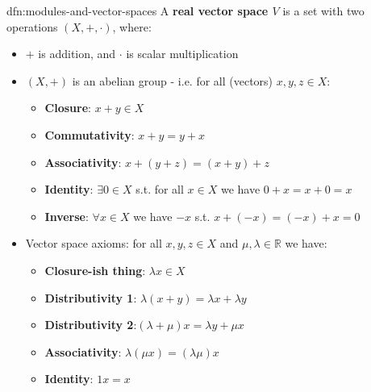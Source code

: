 \documentclass[landscape, 8pt]{extarticle}
\begin{document}
\begin{multicols}{3}
\vspace{-5pt}
\begin{dfn}{dfn:modules-and-vector-spaces}{}
    \vspace{-5pt}
    A \textbf{real vector space $V$} is a set with two operations $(X, +, \cdot)$, where:
    \vspace{-15pt}
    \begin{itemize}[leftmargin=*]
        \item $+$ is addition, and $\cdot$ is scalar multiplication
        \item $(X, +)$ is an abelian group - i.e. for all (vectors) $x,y,z\in X$:
            \vspace{-5pt}
            \begin{itemize}
                \item \textbf{Closure}: $x + y\in X$
                \item \textbf{Commutativity}: $x + y = y + x$
                \item \textbf{Associativity}: $x + (y + z) = (x + y) + z$
                \item \textbf{Identity}: $\exists 0\in X$ s.t. for all $x\in X$ we have $0 + x = x + 0 = x$
                \item \textbf{Inverse}: $\forall x\in X$ we have $-x$ s.t. $x + (-x) = (-x) + x = 0$
            \end{itemize}
            
            \vspace{-5pt}
            \item Vector space axioms: for all $x,y,z\in X$ and $\mu, \lambda \in \mathbb{R}$ we have:
                \vspace{-5pt}
                \begin{itemize}
                    \item \textbf{Closure-ish thing}: $\lambda x\in X$
                    \item \textbf{Distributivity 1}: $\lambda(x + y) = \lambda x + \lambda y$
                    \item \textbf{Distributivity 2}:$(\lambda + \mu)x = \lambda y + \mu x$
                    \item \textbf{Associativity}: $\lambda (\mu x) = (\lambda \mu) x$
                    \item \textbf{Identity}: $1x = x$
                \end{itemize}
    \end{itemize}
\end{dfn}


\end{multicols}
\end{document}
